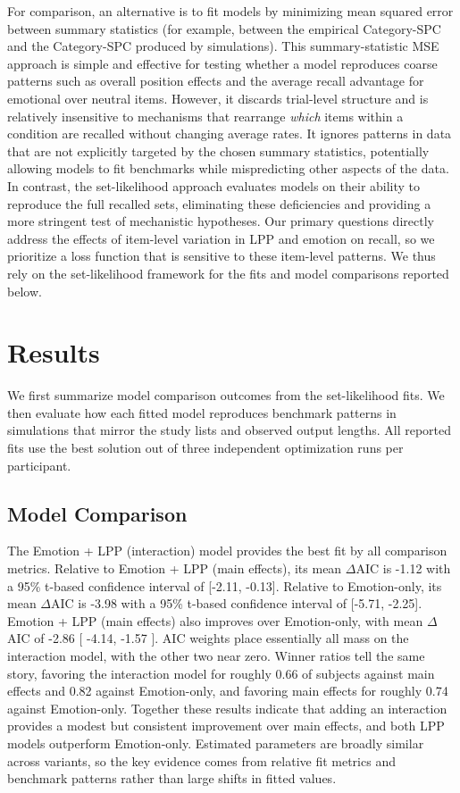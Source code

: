 \documentclass[
  letterpaper,
  DIV=11,
  numbers=noendperiod]{scrartcl}
\begin{document}
For comparison, an alternative is to fit models by minimizing mean
squared error between summary statistics (for example, between the
empirical Category-SPC and the Category-SPC produced by simulations).
This summary-statistic MSE approach is simple and effective for testing
whether a model reproduces coarse patterns such as overall position
effects and the average recall advantage for emotional over neutral
items. However, it discards trial-level structure and is relatively
insensitive to mechanisms that rearrange \emph{which} items within a
condition are recalled without changing average rates. It ignores
patterns in data that are not explicitly targeted by the chosen summary
statistics, potentially allowing models to fit benchmarks while
mispredicting other aspects of the data. In contrast, the set-likelihood
approach evaluates models on their ability to reproduce the full
recalled sets, eliminating these deficiencies and providing a more
stringent test of mechanistic hypotheses. Our primary questions directly
address the effects of item-level variation in LPP and emotion on
recall, so we prioritize a loss function that is sensitive to these
item-level patterns. We thus rely on the set-likelihood framework for
the fits and model comparisons reported below.

\section{Results}\label{results}

We first summarize model comparison outcomes from the set-likelihood
fits. We then evaluate how each fitted model reproduces benchmark
patterns in simulations that mirror the study lists and observed output
lengths. All reported fits use the best solution out of three
independent optimization runs per participant.

\subsection{Model Comparison}\label{model-comparison}

The Emotion + LPP (interaction) model provides the best fit by all
comparison metrics. Relative to Emotion + LPP (main effects), its mean
\(\Delta\)AIC is -1.12 with a 95\% t-based confidence interval of
{[}-2.11, -0.13{]}. Relative to Emotion-only, its mean \(\Delta\)AIC is
-3.98 with a 95\% t-based confidence interval of {[}-5.71, -2.25{]}.
Emotion + LPP (main effects) also improves over Emotion-only, with mean
\(\Delta\)AIC of -2.86 {[} -4.14, -1.57 {]}. AIC weights place
essentially all mass on the interaction model, with the other two near
zero. Winner ratios tell the same story, favoring the interaction model
for roughly 0.66 of subjects against main effects and 0.82 against
Emotion-only, and favoring main effects for roughly 0.74 against
Emotion-only. Together these results indicate that adding an interaction
provides a modest but consistent improvement over main effects, and both
LPP models outperform Emotion-only. Estimated parameters are broadly
similar across variants, so the key evidence comes from relative fit
metrics and benchmark patterns rather than large shifts in fitted
values.
\end{document}
